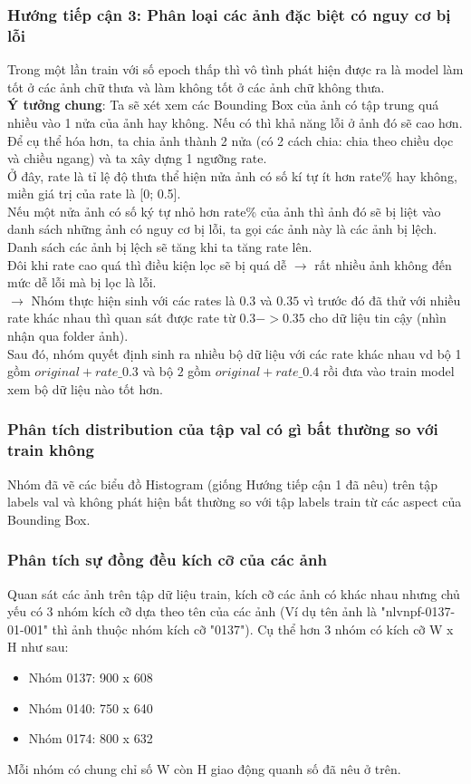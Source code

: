 \documentclass[a4paper,12pt]{article}
\begin{document}
\subsubsection{Hướng tiếp cận 3: Phân loại các ảnh đặc biệt có nguy cơ bị lỗi}
Trong một lần train với số epoch thấp thì vô tình phát hiện được ra là model làm tốt ở các ảnh chữ thưa và làm không tốt ở các ảnh chữ không thưa.
\\
\textbf{Ý tưởng chung}: Ta sẽ xét xem các Bounding Box của ảnh có tập trung quá nhiều vào 1 nửa của ảnh hay không. Nếu có thì khả năng lỗi ở ảnh đó sẽ cao hơn.
Để cụ thể hóa hơn, ta chia ảnh thành 2 nửa (có 2 cách chia: chia theo chiều dọc và chiều ngang) và ta xây dựng 1 ngưỡng rate.
\\
Ở đây, rate là tỉ lệ độ thưa thể hiện nửa ảnh có số kí tự ít hơn rate\% hay không, miền giá trị của rate là [0; 0.5].
\\
Nếu một nửa ảnh có số ký tự nhỏ hơn rate\% của ảnh thì ảnh đó sẽ bị liệt vào danh sách những ảnh có nguy cơ bị lỗi, ta gọi các ảnh này là các ảnh bị lệch.
\\
Danh sách các ảnh bị lệch sẽ tăng khi ta tăng rate lên.
\\
Đôi khi rate cao quá thì điều kiện lọc sẽ bị quá dễ $\rightarrow$ rất nhiều ảnh không đến mức dễ lỗi mà bị lọc là lỗi.
\\
$\rightarrow$ Nhóm thực hiện sinh với các rates là $0.3$ và $0.35$ vì trước đó đã thử với nhiều rate khác nhau thì quan sát được rate từ $0.3 -> 0.35$ cho dữ liệu tin cậy (nhìn nhận qua folder ảnh).
\\
Sau đó, nhóm quyết định sinh ra nhiều bộ dữ liệu với các rate khác nhau vd bộ 1 gồm $original + rate\_0.3$ và bộ $2$ gồm $original + rate\_0.4$ rồi đưa vào train model xem bộ dữ liệu nào tốt hơn. 
\subsubsection{Phân tích distribution của tập val có gì bất thường so với train không}
Nhóm đã vẽ các biểu đồ Histogram (giống Hướng tiếp cận 1 đã nêu) trên tập labels val và không phát hiện bất thường so với tập labels train từ các aspect của Bounding Box.
\subsubsection{Phân tích sự đồng đều kích cỡ của các ảnh}
Quan sát các ảnh trên tập dữ liệu train, kích cỡ các ảnh có khác nhau nhưng chủ yếu có 3 nhóm kích cỡ dựa theo tên của các ảnh (Ví dụ tên ảnh là "nlvnpf-0137-01-001" thì ảnh thuộc nhóm kích cỡ "0137"). Cụ thể hơn 3 nhóm có kích cỡ W x H như sau:
\begin{itemize}
    \item Nhóm 0137: 900 x 608
    \item Nhóm 0140: 750 x 640
    \item Nhóm 0174: 800 x 632
\end{itemize}
Mỗi nhóm có chung chỉ số W còn H giao động quanh số đã nêu ở trên.
\end{document}
